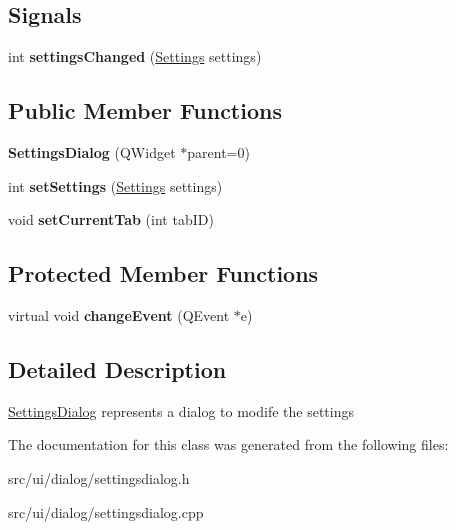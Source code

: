 \subsection*{Signals}
\begin{DoxyCompactItemize}
\item 
\hypertarget{classSettingsDialog_a0d3bc2e27e785778a3fe380efa19ec27}{
int {\bfseries settingsChanged} (\hyperlink{classSettings}{Settings} settings)}
\label{classSettingsDialog_a0d3bc2e27e785778a3fe380efa19ec27}

\end{DoxyCompactItemize}
\subsection*{Public Member Functions}
\begin{DoxyCompactItemize}
\item 
\hypertarget{classSettingsDialog_a9933956b777b2c0451e9119581cc22fb}{
{\bfseries SettingsDialog} (QWidget $\ast$parent=0)}
\label{classSettingsDialog_a9933956b777b2c0451e9119581cc22fb}

\item 
\hypertarget{classSettingsDialog_a47a0830779bc31c1ddaa5a0a782ad6b8}{
int {\bfseries setSettings} (\hyperlink{classSettings}{Settings} settings)}
\label{classSettingsDialog_a47a0830779bc31c1ddaa5a0a782ad6b8}

\item 
\hypertarget{classSettingsDialog_aca93115432ec0c943ea0fad51edd9b29}{
void {\bfseries setCurrentTab} (int tabID)}
\label{classSettingsDialog_aca93115432ec0c943ea0fad51edd9b29}

\end{DoxyCompactItemize}
\subsection*{Protected Member Functions}
\begin{DoxyCompactItemize}
\item 
\hypertarget{classSettingsDialog_a0d0670544a7d571840aa54fb4b74aed7}{
virtual void {\bfseries changeEvent} (QEvent $\ast$e)}
\label{classSettingsDialog_a0d0670544a7d571840aa54fb4b74aed7}

\end{DoxyCompactItemize}


\subsection{Detailed Description}
\hyperlink{classSettingsDialog}{SettingsDialog} represents a dialog to modife the settings 

The documentation for this class was generated from the following files:\begin{DoxyCompactItemize}
\item 
src/ui/dialog/settingsdialog.h\item 
src/ui/dialog/settingsdialog.cpp\end{DoxyCompactItemize}
